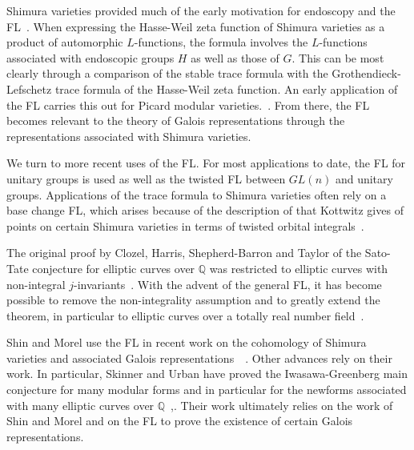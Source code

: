 \documentclass[brochure,english,12pt]{bourbaki}
\theoremstyle{plain}
\newcommand{\ring}[1]{\mathbb{#1}}
\begin{document}
Shimura varieties provided much of the early motivation
for endoscopy and the FL~\cite{LZ:1979}.  When expressing the 
Hasse-Weil zeta function of Shimura varieties as a product of
automorphic $L$-functions, the formula involves the $L$-functions
associated with endoscopic groups $H$ as well as those of $G$.  This
can be most clearly through a comparison of the stable trace formula 
with the Grothendieck-Lefschetz trace formula of the Hasse-Weil zeta
function.
An early application of the FL carries this out for
Picard modular
varieties.~\cite{LPicard:1992}.  From there, the FL becomes relevant to the theory of Galois representations
through the representations associated with Shimura varieties.

We turn to more recent uses of the FL.  
For most applications to
date, the FL for unitary groups is used as well as the twisted FL
between $GL(n)$ and unitary groups.  Applications of the trace formula
to Shimura varieties often rely on a base change FL, which  arises
because of the description of that Kottwitz gives of points on certain
Shimura varieties in terms of twisted orbital
integrals~\cite{Kott:1990}.


The original proof by Clozel, Harris, Shepherd-Barron and Taylor
of the Sato-Tate conjecture for elliptic curves over
$\ring{Q}$ was restricted to elliptic curves with non-integral
$j$-invariants~\cite{Car:Bourbaki}.
With the advent of the general FL, it has become possible to remove
the non-integrality assumption and to greatly extend the theorem, in particular 
to elliptic curves over a totally real number field~\cite{BGHT:2010}.




Shin and Morel use the FL in recent work on the cohomology of Shimura
varieties and associated Galois
representations~\cite{Shin:2010}~\cite{Morel:2010}.  Other advances
rely on their work.  In particular,
Skinner and Urban have proved the Iwasawa-Greenberg main conjecture
for many modular forms and in particular for the newforms associated
with many elliptic curves over
$\ring{Q}$~\cite{Skinner-Urban:2010},\cite{Skinner:2010}.  Their work
ultimately relies on the work of Shin and Morel and on the FL to prove
the existence of certain Galois representations. 
\end{document}
